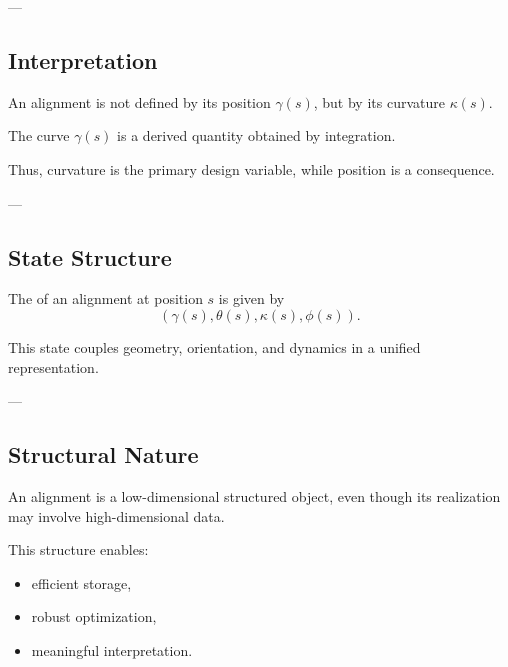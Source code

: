 ---

\subsection{Interpretation}

\begin{remark}
An alignment is not defined by its position \(\gamma(s)\), but by its
curvature \(\kappa(s)\).
\end{remark}

\begin{remark}
The curve \(\gamma(s)\) is a derived quantity obtained by integration.
\end{remark}

\begin{remark}
Thus, curvature is the primary design variable, while position is a
consequence.
\end{remark}

---

\subsection{State Structure}

\begin{definition}
The  of an alignment at position \(s\) is given by
\[
(\gamma(s), \theta(s), \kappa(s), \phi(s)).
\]
\end{definition}

\begin{remark}
This state couples geometry, orientation, and dynamics in a unified
representation.
\end{remark}

---

\subsection{Structural Nature}

\begin{proposition}
An alignment is a low-dimensional structured object, even though its
realization may involve high-dimensional data.
\end{proposition}

\begin{remark}
This structure enables:
\begin{itemize}
\item efficient storage,
\item robust optimization,
\item meaningful interpretation.
\end{itemize}
\end{remark}

